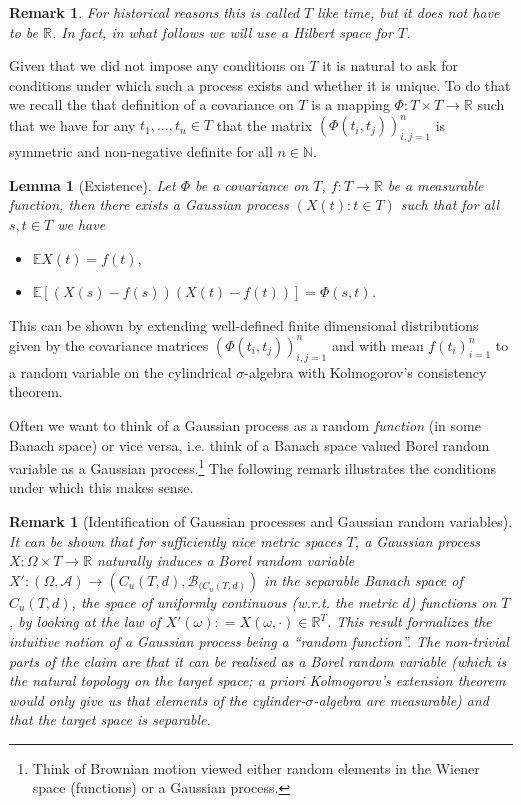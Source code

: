 \documentclass[11pt,reqno]{amsart}
\numberwithin{equation}{section}
\newtheorem{lem}[thm]{Lemma}
\newtheorem{rem}[thm]{Remark}
\newcommand{\deq}{\mathrel{\mathop:}=}
\begin{document}
\begin{rem}
	For historical reasons this is called $T$ like time, but it does not have to be $\mathbb R$. In fact, in what follows we will use a Hilbert space for $T$.
\end{rem}

Given that we did not impose any conditions on $T$ it is natural to ask for conditions under which such a process exists and whether it is unique. To do that we recall the that definition of a covariance on $T$ is a mapping $\Phi:T\times T\rightarrow\mathbb R$ such that we have for any $t_1,\dots, t_n\in T$ that the matrix $(\Phi(t_i,t_j))_{i,j=1}^n$ is symmetric and non-negative definite for all $n\in\mathbb N$.

\begin{lem}[Existence]\label{lem:existenceofGPgivenCov}
	Let $\Phi$ be a covariance on $T$, $f:T\rightarrow\mathbb R$ be a measurable function, then there exists a Gaussian process $(X(t):t\in T)$ such that for all $s,t\in T$ we have
	\begin{itemize}
		\item $\mathbb E X(t) = f(t)$,
		\item $\mathbb E[(X(s)-f(s))(X(t)-f(t))]=\Phi(s,t)$.
	\end{itemize}
\end{lem}

This can be shown by extending well-defined finite dimensional distributions given by the covariance matrices $(\Phi(t_i,t_j))_{i,j=1}^n$ and with mean $f(t_i)_{i=1}^n$ to a random variable on the cylindrical $\sigma$-algebra with Kolmogorov's consistency theorem.

Often we want to think of a Gaussian process as a random \emph{function} (in some Banach space) or vice versa, i.e. think of a Banach space valued Borel random variable as a Gaussian process.\footnote{Think of Brownian motion viewed either random elements in the Wiener space (functions) or a Gaussian process.} The following remark illustrates the conditions under which this makes sense.

\begin{rem}[Identification of Gaussian processes and Gaussian random variables]\label{rem:GPandGrvs}
	It can be shown that for sufficiently nice metric spaces $T$, a Gaussian process $X:\Omega\times T\rightarrow\mathbb R$ naturally induces a Borel random variable $X':(\Omega,\mathcal A)\rightarrow (C_u(T,d),\mathcal B_{(C_u(T,d)})$ in the separable Banach space of $C_u(T,d)$, the space of uniformly continuous (w.r.t. the metric $d$) functions on $T$, by looking at the law of $X'(\omega)\deq X(\omega,\cdot)\in\mathbb R^T$.
	This result formalizes the intuitive notion of a Gaussian process being a ``random function''. The non-trivial parts of the claim are that it can be realised as a \emph{Borel} random variable (which is the natural topology on the target space; a priori Kolmogorov's extension theorem would only give us that elements of the cylinder-$\sigma$-algebra are measurable) and that the target space is \emph{separable}.
\end{rem}
\end{document}
